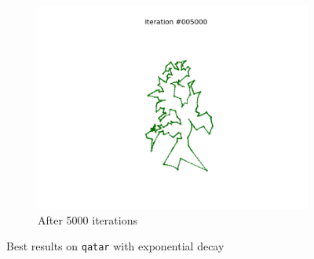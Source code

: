 \documentclass[11pt]{article}
\begin{document}
\begin{figure}
\begin{subfigure}{.33\textwidth}
  \includegraphics[trim={6cm 2cm 6cm 2cm}, clip=true,width=\linewidth]{q_5000.png}
  \caption{After 5000 iterations}
\end{subfigure}
\caption{Best results on \texttt{qatar} with exponential decay}
\label{fig:bqatar}
\end{figure}
\end{document}
